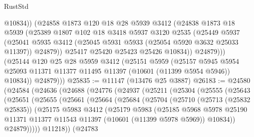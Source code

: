 \begin{lexlean}{RustStd}
\begin{coremodule}
                @10834))
            (@24858
              @1873
              @120
              @18
              @28
              @5939
              @3412
              (@24838
                @1873
                @18
                @5939
                (@25389
                  @1807
                  @102
                  @18
                  @3418
                  @5937
                  @3120
                  @2535
                  (@25449
                    @5937
                    (@25041
                      @5935
                      @3412
                      (@25045 @5931 @5933 (@25054 @5920 @3632 @25033 @11397))
                      @24879))
                  @25417
                  @25420
                  @25423
                  @25426
                  @10834))
              @24879)))
        (@25144
          @120
          @25
          @28
          @5959
          @3412
          (@25151
            @5959
            (@25157
              @5945
              @5954
              @25093
              @11371
              @11377
              @11495
              @11397
              (@10601 (@11399 @5954 @5946))
              @10834))
          @24879)))
@25835 := @11147 (@13476 @25 @3887)
@26183 := @24580
    (@24584
      (@24636
        (@24688
          (@24776
            (@24937
              (@25211
                (@25304
                  (@25555
                    (@25643
                      (@25651
                        (@25655
                          (@25661
                            (@25664
                              (@25684
                                (@25704
                                  (@25710
                                    (@25713 (@25832 @25835))
                                    (@25175
                                      @5983
                                      @3412
                                      (@25179
                                        @5983
                                        (@25185
                                          @5968
                                          @5978
                                          @25190
                                          @11371
                                          @11377
                                          @11543
                                          @11397
                                          (@10601 (@11399 @5978 @5969))
                                          @10834))
                                      @24879)))))
                            @11218))
                        (@24783

\end{coremodule}
\end{lexlean}
